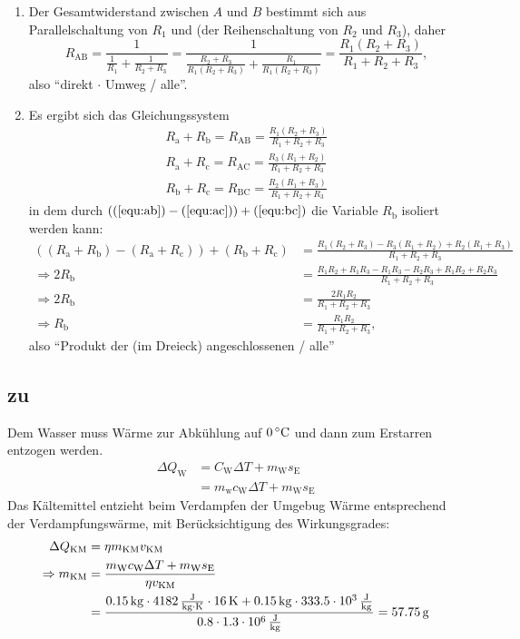 \documentclass[a4paper]{scrartcl}
\begin{document}
\begin{enumerate}[noitemsep]
  \item Der Gesamtwiderstand zwischen $A$ und $B$ bestimmt sich aus Parallelschaltung von $R_1$ und (der Reihenschaltung von $R_2$ und $R_3$), daher
    \begin{equation*}
      R_\text{AB} = \frac{1}{\frac{1}{R_1} + \frac{1}{R_2+R_3}} = \frac{1}{\frac{R_2+R_3}{R_1(R_2+R_3)} + \frac{R_1}{R_1(R_2+R_3)}} = \frac{R_1(R_2+R_3)}{R_1+R_2+R_3},
    \end{equation*}
    also "`direkt $\cdot$ Umweg / alle"'.
  \item Es ergibt sich das Gleichungssystem
    \begin{align}
      R_\text{a}+R_\text{b} = R_\text{AB} = \frac{R_1(R_2+R_3)}{R_1+R_2+R_3}\label{equ:ab}\\
      R_\text{a}+R_\text{c} = R_\text{AC} = \frac{R_3(R_1+R_2)}{R_1+R_2+R_3}\label{equ:ac}\\
      R_\text{b}+R_\text{c} = R_\text{BC} = \frac{R_2(R_1+R_3)}{R_1+R_2+R_3}\label{equ:bc}
    \end{align}
    in dem durch $((\ref{equ:ab}) - (\ref{equ:ac})) + (\ref{equ:bc})$ die Variable $R_\text{b}$ isoliert werden kann:
    \begin{align*}
      ((R_\text{a} + R_\text{b}) - (R_\text{a} + R_\text{c})) + (R_\text{b} + R_\text{c}) &= \frac{R_1(R_2+R_3) - R_3(R_1+R_2) + R_2(R_1+R_3)}{R_1+R_2+R_3}\\
      \Rightarrow 2R_\text{b} & = \frac{R_1R_2 + R_1R_3 - R_1R_3 - R_2R_3 + R_1R_2 + R_2R_3}{R_1+R_2+R_3}\\
      \Rightarrow 2R_\text{b} & = \frac{2R_1R_2}{R_1+R_2+R_3}\\
      \Rightarrow R_\text{b} &= \frac{R_1R_2}{R_1+R_2+R_3},
    \end{align*}
    also "`Produkt der (im Dreieck) angeschlossenen / alle"'
\end{enumerate}


\subsection{zu }
\label{lsg:Kuehlschrank}
Dem Wasser muss Wärme zur Abkühlung auf $\unit[0]{^\circ C}$ und dann zum Erstarren entzogen werden.
\begin{align*}
  \Delta Q_\text{W} &= C_\text{W}\Delta T + m_\text{W}s_\text{E}\\
  & = m_\text{w} c_\text{W}\Delta T + m_\text{W}s_\text{E}
\end{align*}
Das Kältemittel entzieht beim Verdampfen der Umgebug Wärme entsprechend der Verdampfungswärme, mit Berücksichtigung des Wirkungsgrades:
\begin{align*}
  \Delta Q_\text{KM} & = \eta m_\text{KM}v_\text{KM}\\
  \Rightarrow m_\text{KM} & = \frac{m_\text{W}c_\text{W} \Delta T + m_\text{W}s_\text{E}}{\eta v_\text{KM}} \\
  & = \frac{\unit[0.15]{kg} \cdot \unit[4182]{\frac{J}{kg \cdot K}} \cdot \unit[16]{K} + \unit[0.15]{kg}\cdot\unit[333.5 \cdot 10^3]{\frac{J}{kg}}}{ 0.8 \cdot \unit[1.3 \cdot 10^6]{\frac{J}{kg}}} = \unit[57.75]{g}
\end{align*}
\end{document}
